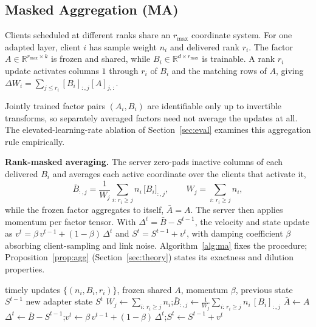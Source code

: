 \documentclass[a4paper,fleqn]{cas-dc}
\begin{document}
\subsection{Masked Aggregation (MA)}
\label{sec:aggregation}
Clients scheduled at different ranks share an $r_{\max}$ coordinate system. For one adapted layer, client $i$ has sample weight $n_i$ and delivered rank $r_i$. The factor $A\in\mathbb R^{r_{\max}\times k}$ is frozen and shared, while $B_i\in\mathbb R^{d\times r_{\max}}$ is trainable. A rank $r_i$ update activates columns $1$ through $r_i$ of $B_i$ and the matching rows of $A$, giving $\Delta W_i=\sum_{j\le r_i}[B_i]_{:,j}[A]_{j,:}$.

Jointly trained factor pairs $(A_i,B_i)$ are identifiable only up to invertible transforms, so separately averaged factors need not average the updates at all. The elevated-learning-rate ablation of Section~\ref{sec:eval} examines this aggregation rule empirically.

\textbf{Rank-masked averaging.} The server zero-pads inactive columns of each delivered $B_i$ and averages each active coordinate over the clients that activate it,
\begin{equation}
\bar B_{:,j}=\frac{1}{W_j}\sum_{i:\,r_i\ge j} n_i\,\big[B_i\big]_{:,j},
\qquad
W_j=\sum_{i:\,r_i\ge j} n_i ,
\label{eq:maskavg}
\end{equation}
while the frozen factor aggregates to itself, $\bar A=A$. The server then applies momentum per factor tensor. With $\Delta^t=\bar B-S^{t-1}$, the velocity and state update as $v^t=\beta\,v^{t-1}+(1-\beta)\,\Delta^t$ and $S^t=S^{t-1}+v^t$, with damping coefficient $\beta$ absorbing client-sampling and link noise. Algorithm~\ref{alg:ma} fixes the procedure; Proposition~\ref{prop:agg} (Section~\ref{sec:theory}) states its exactness and dilution properties.

\begin{algorithm}[t]
\caption{Masked Aggregation (MA)}
\label{alg:ma}
\begin{algorithmic}[1]
\REQUIRE timely updates $\{(n_i,B_i,r_i)\}$, frozen shared $A$, momentum $\beta$, previous state $S^{t-1}$
\ENSURE new adapter state $S^t$
  \STATE $W_j\gets\sum_{i:\,r_i\ge j} n_i$;\quad $\bar B_{:,j}\gets\frac{1}{W_j}\sum_{i:\,r_i\ge j} n_i\,[B_i]_{:,j}$
\ENDFOR
\STATE $\bar A\gets A$
\STATE $\Delta^t\gets\bar B-S^{t-1}$;\quad $v^t\gets\beta\,v^{t-1}+(1-\beta)\,\Delta^t$;\quad $S^t\gets S^{t-1}+v^t$
\end{algorithmic}
\end{algorithm}
\end{document}

